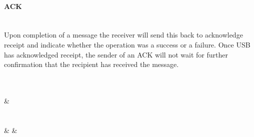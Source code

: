 \documentclass[10pt]{article}
\begin{document}
	\paragraph{ACK} \mbox{}\\
	Upon completion of a message the receiver will send this back to acknowledge receipt and indicate whether the operation was a success or a failure. Once USB has acknowledged receipt, the sender of an ACK will not wait for further confirmation that the recipient has received the message. \\
	\\
	\begin{bytefield}[bitwidth=1.7em]{32}
	 \\
	 &
	 \\
	 \\
	 \\
	 &
	 &
	 \\
	\\
	\end{bytefield}\\
\end{document}
